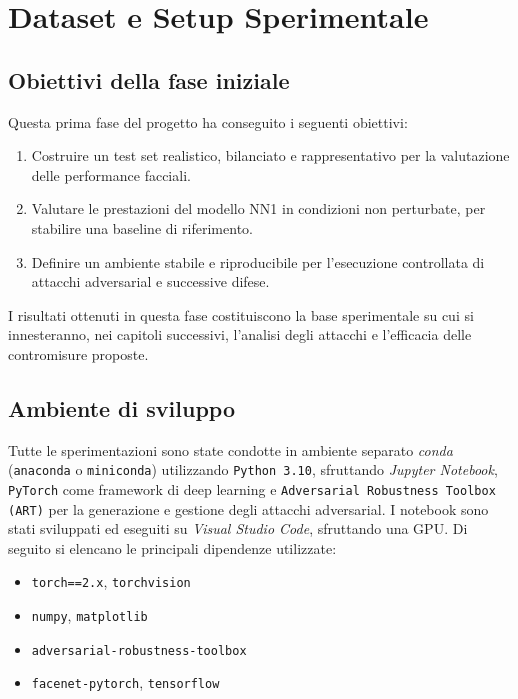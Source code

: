 \chapter{Dataset e Setup Sperimentale}
    \section{Obiettivi della fase iniziale}
        Questa prima fase del progetto ha conseguito i seguenti obiettivi:
            \begin{enumerate}
                \item Costruire un test set realistico, bilanciato e rappresentativo per la valutazione delle performance facciali.
                \item Valutare le prestazioni del modello NN1 in condizioni non perturbate, per stabilire una baseline di riferimento.
                \item Definire un ambiente stabile e riproducibile per l’esecuzione controllata di attacchi adversarial e successive difese.
            \end{enumerate}

        \noindent I risultati ottenuti in questa fase costituiscono la base sperimentale su cui si innesteranno, nei capitoli successivi, l’analisi degli attacchi e l’efficacia delle contromisure proposte.

    \section{Ambiente di sviluppo}
        Tutte le sperimentazioni sono state condotte in ambiente separato \textit{conda} (\texttt{anaconda} o \texttt{miniconda}) utilizzando \texttt{Python 3.10}, sfruttando \textit{Jupyter Notebook}, \texttt{PyTorch} come framework di deep learning e \texttt{Adversarial Robustness Toolbox (ART)} per la generazione e gestione degli attacchi adversarial. I notebook sono stati sviluppati ed eseguiti su \textit{Visual Studio Code}, sfruttando una GPU.
        Di seguito si elencano le principali dipendenze utilizzate:
            \begin{itemize}
                \item \texttt{torch==2.x}, \texttt{torchvision}
                
                \item \texttt{numpy}, \texttt{matplotlib}
                
                \item \texttt{adversarial-robustness-toolbox}
                
                \item \texttt{facenet-pytorch}, \texttt{tensorflow}
            \end{itemize}

